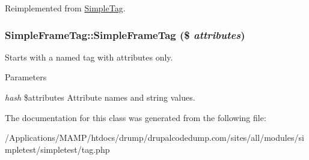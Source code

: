 Reimplemented from \hyperlink{class_simple_tag_a158fcbf8b82e7a6f7b6855c1dbe0715b}{SimpleTag}.\hypertarget{class_simple_frame_tag_a0a1034bef549bd8ed4896fdc83251867}{
\subsubsection[{SimpleFrameTag}]{\setlength{\rightskip}{0pt plus 5cm}SimpleFrameTag::SimpleFrameTag (\$ {\em attributes})}}
\label{class_simple_frame_tag_a0a1034bef549bd8ed4896fdc83251867}
Starts with a named tag with attributes only. 
\begin{DoxyParams}{Parameters}
\item[{\em hash}]\$attributes Attribute names and string values. \end{DoxyParams}


The documentation for this class was generated from the following file:\begin{DoxyCompactItemize}
\item 
/Applications/MAMP/htdocs/drump/drupalcodedump.com/sites/all/modules/simpletest/simpletest/tag.php\end{DoxyCompactItemize}
